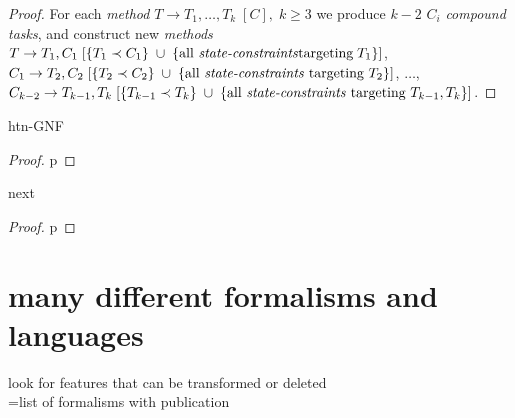 \begin{proof}
    For each \emph{method} $T \rightarrow T_1, \dots, T_k \; [C], \; k \geq 3$ we produce $k - 2$ $C_i$ \emph{compound tasks}, and construct new \emph{methods} $T \rightarrow T_1, C_1 \; [\{T_1 \prec C_1\} \; \cup \; \{\text{all \emph{state-constraints}} \\ \text{targeting} \; T_1\}]$, $C_1 \rightarrow T_2, C_2 \; [\{T_2 \prec C_2\} \; \cup \; \{\text{all \emph{state-constraints} targeting $T_2$}\}]$, $\dots$, $C_{k-2} \rightarrow T_{k-1}, T_k \; [\{T_{k-1} \prec T_k\} \; \cup \; \{\text{all \emph{state-constraints} targeting $T_{k-1}, T_k$}\}]$.
\end{proof}

\begin{thm}\label{thm04:13}
    htn-GNF
\end{thm}
\begin{proof}
    p
\end{proof}

\begin{thm}\label{thm04:14}
    next
\end{thm}
\begin{proof}
    p
\end{proof}

\section{many different formalisms and languages}
look for features that can be transformed or deleted \\
\cite{hddl}=list of formalisms with publication
